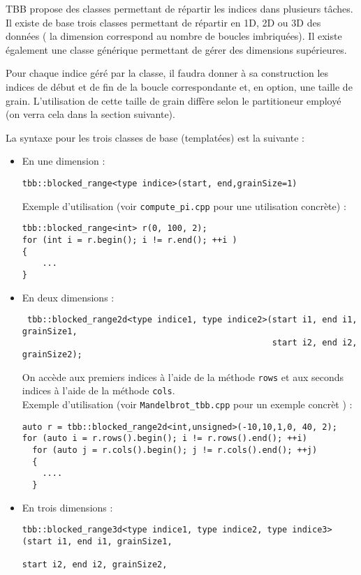\documentclass[11pt,a4paper]{article}
\begin{document}
TBB propose des classes permettant de répartir les indices dans plusieurs tâches.
Il existe de base trois classes permettant de répartir en 1D, 2D ou 3D des données 
( la dimension correspond au nombre de boucles imbriquées). Il existe également
une classe générique permettant de gérer des dimensions supérieures.

Pour chaque indice géré par la classe, il faudra donner à sa construction
les indices de début et de fin de la boucle correspondante et,
en option, une taille de grain. L'utilisation de cette taille de grain 
diffère selon le partitioneur employé (on verra cela dans la section suivante).

La syntaxe pour les trois classes de base (templatées) est la suivante :
\begin{itemize}
    \item En une dimension : 
    \begin{lstlisting}
tbb::blocked_range<type indice>(start, end,grainSize=1)
    \end{lstlisting}
    Exemple d'utilisation (voir \texttt{compute\_pi.cpp} pour une utilisation concrète) :
    \begin{lstlisting}
tbb::blocked_range<int> r(0, 100, 2);
for (int i = r.begin(); i != r.end(); ++i )
{
    ...
}
    \end{lstlisting}
    \item En deux dimensions :
    \begin{lstlisting}
 tbb::blocked_range2d<type indice1, type indice2>(start i1, end i1, grainSize1, 
                                                  start i2, end i2, grainSize2);
    \end{lstlisting}
    On accède aux premiers indices à l'aide de la méthode \texttt{rows}
    et aux seconds indices à l'aide de la méthode \texttt{cols}.\\
    Exemple d'utilisation (voir \texttt{Mandelbrot\_tbb.cpp} pour un exemple concrèt ) :
    \begin{lstlisting}
auto r = tbb::blocked_range2d<int,unsigned>(-10,10,1,0, 40, 2);
for (auto i = r.rows().begin(); i != r.rows().end(); ++i)
  for (auto j = r.cols().begin(); j != r.cols().end(); ++j)
  {
    ....
  }
    \end{lstlisting}
    \item En trois dimensions :
    \begin{lstlisting}
tbb::blocked_range3d<type indice1, type indice2, type indice3>(start i1, end i1, grainSize1,
                                                               start i2, end i2, grainSize2,

\end{lstlisting}
\end{itemize}
\end{document}
